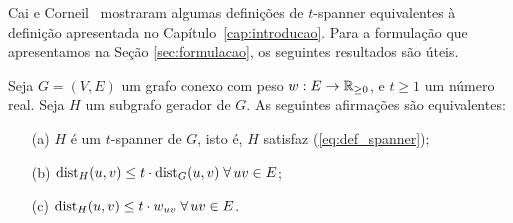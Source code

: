Cai e Corneil~\cite{CaiC1995}  mostraram algumas definições de $t$-spanner equivalentes à definição apresentada
no Capítulo~\ref{cap:introducao}. Para a formulação que
apresentamos na Seção \ref{sec:formulacao}, os seguintes resultados são úteis.

\begin{lema}
  \label{lem:definicoes}
  Seja $G = (V,E)$ um grafo conexo com peso
\hbox{$w: E \to \mathbb{R}_{\ge 0}$,} e $t \ge 1$ um número real. 
Seja $H$ um subgrafo gerador de $G$. 
As seguintes afirmações são equivalentes:

\begin{itemize}
  \item[{\rm (a)}] $H$ é um $t$-spanner de $G$, isto é, $H$ satisfaz
    (\ref{eq:def_spanner});

  \item[{\rm (b)}] ${\mathrm{dist}}_{H}(u,v) \le t \cdot {\mathrm{dist}}_{G}(u,v) \;\forall\,uv \in E$;

  \item[{\rm (c)}] ${\mathrm{dist}}_{H}(u,v) \le t \cdot w_{uv} \;\forall\,uv \in E$.
\end{itemize}
\end{lema}

